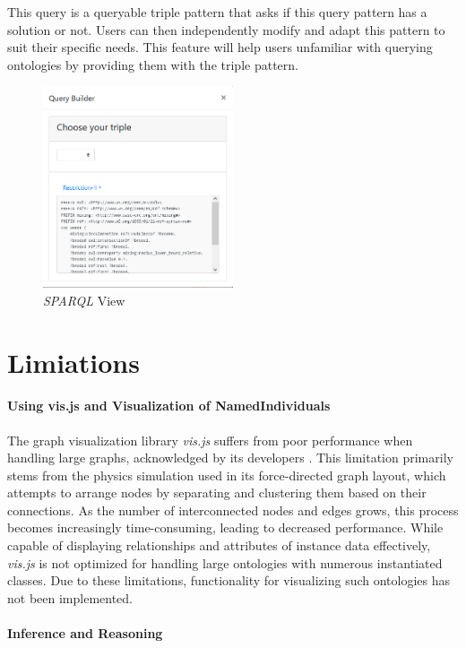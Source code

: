 This query is a queryable triple pattern that asks if this query pattern has a solution or not. 
Users can then independently modify and adapt this pattern to suit their specific needs. 
This feature will help users unfamiliar with querying ontologies by providing them with the triple pattern.
\begin{figure}[H]
    \includegraphics[width=0.5\textwidth]{Graphics/OwlVisualizer/queryBuilder5.png}
    \centering
    \caption{\textit{SPARQL} View}
\end{figure}

\section{Limiations}

\paragraph{Using vis.js and Visualization of NamedIndividuals}

The graph visualization library \textit{vis.js} suffers from poor performance when handling large graphs, acknowledged by its developers \cite{visjs}. 
This limitation primarily stems from the physics simulation used in its force-directed graph layout, 
which attempts to arrange nodes by separating and clustering them based on their connections. 
As the number of interconnected nodes and edges grows, this process becomes increasingly time-consuming, leading to decreased performance. 
While capable of displaying relationships and attributes of instance data effectively, 
\textit{vis.js} is not optimized for handling large ontologies with numerous instantiated classes. 
Due to these limitations, functionality for visualizing such ontologies has not been implemented.

\paragraph{Inference and Reasoning}

